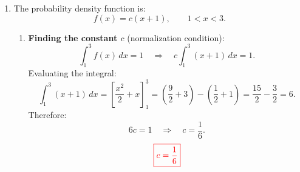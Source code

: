 \documentclass[12pt,a4paper]{article}
\begin{document}
\begin{enumerate}
\begin{center}
\end{center}

\begin{enumerate}
\item \textbf{Total defect probability $P(H)$:} \\
A defective part must have come from either A or B:
\[
P(H)=P(H\mid A)P(A)+P(H\mid B)P(B)
\]
\[
P(H)=0.05\cdot0.60+0.10\cdot0.40=0.030+0.040=0.070.
\]
\[
{\color{red}\boxed{P(H)=0.07}}
\]

\item \textbf{$P(B\mid H)$ using Bayes' theorem:} \\
The probability that a known defective part came from B is:
\[
P(B\mid H)=\frac{P(H\mid B)\,P(B)}{P(H)}=\frac{0.10\cdot0.40}{0.070}=\frac{0.040}{0.070}=\frac{4}{7}\approx 0.5714.
\]
\[
{\color{red}\boxed{P(B\mid H)=\frac{4}{7}\approx 0.5714}}
\]
\end{enumerate}

\item The probability density function is:
\[
f(x)=c(x+1),\qquad 1<x<3.
\]

\begin{enumerate}
\item \textbf{Finding the constant $c$} (normalization condition):
\[
\int_{1}^{3}f(x)\,dx=1
\quad\Rightarrow\quad
c\int_{1}^{3}(x+1)\,dx=1.
\]
Evaluating the integral:
\[
\int_{1}^{3}(x+1)\,dx=\left[\frac{x^2}{2}+x\right]_{1}^{3}
=\left(\frac{9}{2}+3\right)-\left(\frac{1}{2}+1\right)=\frac{15}{2}-\frac{3}{2}=6.
\]
Therefore:
\[
6c=1\quad\Rightarrow\quad c=\frac{1}{6}.
\]
\[
{\color{red}\boxed{c=\frac{1}{6}}}
\]


\end{enumerate}
\end{enumerate}
\end{document}
